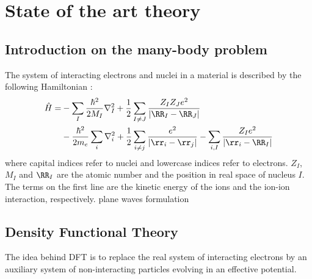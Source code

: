 \chapter{ State of the art theory}
\chaptertoc{}

\section{Introduction on the many-body problem}
The system of interacting electrons and nuclei in a material is described by the following Hamiltonian :
\begin{align}
	\hat{H} = &- \sum_I \frac{\hbar^2}{2 M_I} \nabla^2_I + \frac{1}{2} \sum_{I\neq J} \frac{Z_I Z_J e^2}{\left| \RR_I - \RR_J \right|} \nonumber \\
	&- \frac{\hbar^2}{2m_e} \sum_i \nabla^2_i + \frac{1}{2} \sum_{i\neq j} \frac{e^2}{\left| \rr_i - \rr_j \right|} - \sum_{i,I} \frac{Z_I e^2}{\left|\rr_i - \RR_I \right|}
\end{align}
where capital indices refer to nuclei and lowercase indices refer to electrons. $Z_I$, $M_I$ and $\RR_I$ are the atomic number and the position in real space of nucleus $I$.
The terms on the first line are the kinetic energy of the ions and the ion-ion interaction, respectively.
plane waves formulation

\section{Density Functional Theory}
The idea behind \gls{DFT} is to replace the real system of interacting electrons by an auxiliary system of non-interacting particles evolving in an effective potential.

